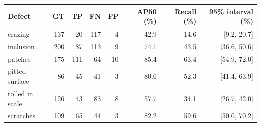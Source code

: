\begin{tabular}{lrrrrrrr}
\hline
Defect & GT & TP & FN & FP & AP50 (\%) & Recall (\%) & 95\% interval (\%) \\
\hline
crazing & 137 & 20 & 117 & 4 & 42.9 & 14.6 & [9.2, 20.7] \\
inclusion & 200 & 87 & 113 & 9 & 74.1 & 43.5 & [36.6, 50.6] \\
patches & 175 & 111 & 64 & 10 & 85.4 & 63.4 & [54.9, 72.0] \\
pitted surface & 86 & 45 & 41 & 3 & 80.6 & 52.3 & [41.4, 63.9] \\
rolled in scale & 126 & 43 & 83 & 8 & 57.7 & 34.1 & [26.7, 42.0] \\
scratches & 109 & 65 & 44 & 3 & 82.2 & 59.6 & [50.0, 70.2] \\
\hline
\end{tabular}
